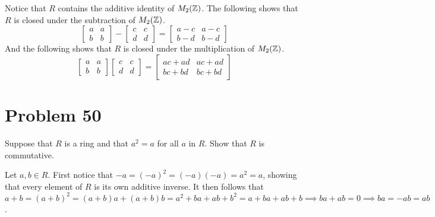 \documentclass{article}
\begin{document}
Notice that $R$ contains the additive identity of $M_2(\mathbb{Z})$.
The following shows that $R$ is closed under the subtraction of $M_2(\mathbb{Z})$.
\begin{equation*}
\left[\begin{array}{cc}a&a\\b&b\end{array}\right]-
\left[\begin{array}{cc}c&c\\d&d\end{array}\right]=
\left[\begin{array}{cc}a-c&a-c\\b-d&b-d\end{array}\right]
\end{equation*}
And the following shows that $R$ is closed under the multiplication of $M_2(\mathbb{Z})$.
\begin{equation*}
\left[\begin{array}{cc}a&a\\b&b\end{array}\right]
\left[\begin{array}{cc}c&c\\d&d\end{array}\right]=
\left[\begin{array}{cc}ac+ad&ac+ad\\bc+bd&bc+bd\end{array}\right]
\end{equation*}

\section*{Problem 50}

Suppose that $R$ is a ring and that $a^2=a$ for all $a$ in $R$.  Show that $R$ is
commutative.

Let $a,b\in R$.  
First notice that $-a = (-a)^2 = (-a)(-a) = a^2 = a$, showing that every element
of $R$ is its own additive inverse.  It then follows that
$a+b = (a+b)^2 = (a+b)a + (a+b)b = a^2+ba+ab+b^2 = a+ba+ab+b\implies ba+ab=0\implies ba=-ab=ab$.
\end{document}
